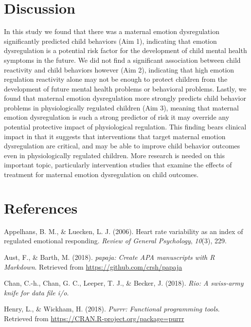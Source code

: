 \documentclass[man]{apa6}
\begin{document}
\section{Discussion}\label{discussion}

In this study we found that there was a maternal emotion dysregulation
significantly predicted child behaviors (Aim 1), indicating that emotion
dysregulation is a potential risk factor for the development of child
mental health symptoms in the future. We did not find a significant
association between child reactivity and child behaviors however (Aim
2), indicating that high emotion regulation reactivity alone may not be
enough to protect children from the development of future mental health
problems or behavioral problems. Lastly, we found that maternal emotion
dysregulation more strongly predicts child behavior problems in
physiologically regulated children (Aim 3), meaning that maternal
emotion dysregulation is such a strong predictor of risk it may override
any potential protective impact of physiological regulation. This
finding bears clinical impact in that it suggests that interventions
that target maternal emotion dysregulation are critical, and may be able
to improve child behavior outcomes even in physiologically regulated
children. More research is needed on this important topic, particularly
intervention studies that examine the effects of treatment for maternal
emotion dysregulation on child outcomes.

\newpage

\section{References}\label{references}

\begingroup
\setlength{\parindent}{-0.5in} \setlength{\leftskip}{0.5in}

\hypertarget{refs}{}
\hypertarget{ref-appelhans2006heart}{}
Appelhans, B. M., \& Luecken, L. J. (2006). Heart rate variability as an
index of regulated emotional responding. \emph{Review of General
Psychology}, \emph{10}(3), 229.

\hypertarget{ref-R-papaja}{}
Aust, F., \& Barth, M. (2018). \emph{papaja: Create APA manuscripts with
R Markdown}. Retrieved from \url{https://github.com/crsh/papaja}

\hypertarget{ref-R-rio}{}
Chan, C.-h., Chan, G. C., Leeper, T. J., \& Becker, J. (2018).
\emph{Rio: A swiss-army knife for data file i/o}.

\hypertarget{ref-R-purrr}{}
Henry, L., \& Wickham, H. (2018). \emph{Purrr: Functional programming
tools}. Retrieved from \url{https://CRAN.R-project.org/package=purrr}
\end{document}
